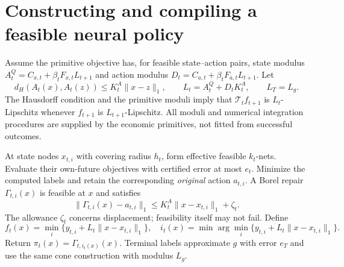 \section{Constructing and compiling a feasible neural policy}\label{sec:construction49}
Assume the primitive objective has, for feasible state--action pairs, state modulus $A_t^Q=C_{x,t}+\beta_tF_{x,t}L_{t+1}$ and action modulus $D_t=C_{a,t}+\beta_tF_{a,t}L_{t+1}$. Let
\[
 d_H(A_t(x),A_t(z))\le K_t^A\|x-z\|_1,
 \qquad L_t=A_t^Q+D_tK_t^A,\qquad L_T=L_g.
\]
The Hausdorff condition and the primitive moduli imply that $\mathcal T_tf_{t+1}$ is $L_t$-Lipschitz whenever $f_{t+1}$ is $L_{t+1}$-Lipschitz. All moduli and numerical integration procedures are supplied by the economic primitives, not fitted from successful outcomes.

At state nodes $x_{t,i}$ with covering radius $h_t$, form effective feasible $k_t$-nets. Evaluate their own-future objectives with certified error at most $e_t$. Minimize the computed labels and retain the corresponding \emph{original} action $a_{t,i}$. A Borel repair $\Gamma_{t,i}(x)$ is feasible at $x$ and satisfies
\begin{equation}\label{eq:repair49}
 \|\Gamma_{t,i}(x)-a_{t,i}\|_1\le K_t^A\|x-x_{t,i}\|_1+\zeta_t.
\end{equation}
The allowance $\zeta_t$ concerns displacement; feasibility itself may not fail. Define
\begin{equation}\label{eq:cone49}
 f_t(x)=\min_i\{y_{t,i}+L_t\|x-x_{t,i}\|_1\},\quad
 i_t(x)=\min\arg\min_i\{y_{t,i}+L_t\|x-x_{t,i}\|_1\}.
\end{equation}
Return $\pi_t(x)=\Gamma_{t,i_t(x)}(x)$. Terminal labels approximate $g$ with error $e_T$ and use the same cone construction with modulus $L_g$.

